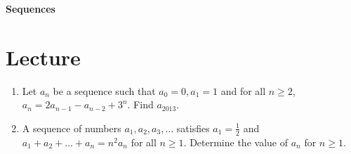 \documentclass[11pt]{article}
\theoremstyle{theorem}
\theoremstyle{definition}
\theoremstyle{remark}
\theoremstyle{definition}
\theoremstyle{remark}
\begin{document}
\begin{center} 
        \Large \textbf{Sequences}
\end{center}


\section{Lecture}
\begin{enumerate}

\item Let $a_n$ be a sequence such that $a_0=0, a_1=1$ and for all $n \ge 2$, $a_n=2a_{n-1}-a_{n-2}+3^{n}$. Find $a_{2013}$.

\item A sequence of numbers $a_1,a_2,a_3,...$ satisfies $a_1=\frac{1}{2}$ and $a_1+a_2+...+a_n=n^2a_n$ for all $n\ge 1$. Determine the value of $a_n$ for $n\ge 1$.

\end{enumerate}
\end{document}
